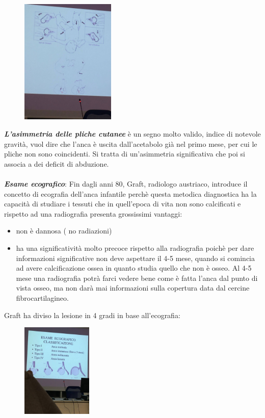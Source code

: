 \begin{figure}[!ht]
\centering
\includegraphics[width=0.4\textwidth]{018/image8.jpeg}
\end{figure}

\emph{\textbf{L'asimmetria delle pliche cutanee}} è un segno molto valido, indice di notevole gravità, vuol dire che l'anca è uscita dall'acetabolo già nel primo mese, per cui le pliche non sono coincidenti. Si tratta di un'asimmetria significativa che poi si associa a dei deficit di abduzione.
\\\\
\textbf{\emph{Esame ecografico}}: Fin dagli anni 80, Graft, radiologo austriaco, introduce il concetto di ecografia dell'anca infantile perchè questa metodica diagnostica ha la capacità di studiare i tessuti che in
quell'epoca di vita non sono calcificati e rispetto ad una radiografia presenta grossissimi vantaggi:
\begin{itemize}
\item non è dannosa ( no radiazioni)
\item ha una significatività molto precoce rispetto alla radiografia poichè per dare informazioni significative non deve aspettare il 4-5 mese, quando si comincia ad avere calcificazione ossea in quanto studia quello che non è osseo. Al 4-5 mese una radiografia potrà farci vedere bene come è fatta l'anca dal punto di vista osseo, ma non darà mai informazioni sulla copertura data dal cercine fibrocartilagineo.
\end{itemize}

Graft ha diviso la lesione in 4 gradi in base all'ecografia:

\begin{figure}[!ht]
\centering
\includegraphics[width=0.3\textwidth]{018/image9.jpeg}
\end{figure}

